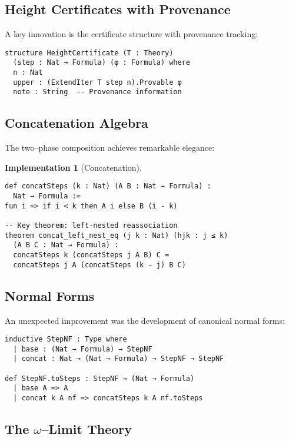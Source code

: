 \documentclass[11pt]{article}
\theoremstyle{definition}
\newtheorem{implementation}[theorem]{Implementation}
\theoremstyle{remark}
\begin{document}
\subsection{Height Certificates with Provenance}

A key innovation is the certificate structure with provenance tracking:

\begin{lstlisting}[language={}]
structure HeightCertificate (T : Theory) 
  (step : Nat → Formula) (φ : Formula) where
  n : Nat
  upper : (ExtendIter T step n).Provable φ
  note : String  -- Provenance information
\end{lstlisting}

\subsection{Concatenation Algebra}

The two--phase composition achieves remarkable elegance:

\begin{implementation}[Concatenation]
\begin{lstlisting}[language={}]
def concatSteps (k : Nat) (A B : Nat → Formula) : 
  Nat → Formula :=
fun i => if i < k then A i else B (i - k)

-- Key theorem: left-nested reassociation
theorem concat_left_nest_eq (j k : Nat) (hjk : j ≤ k) 
  (A B C : Nat → Formula) :
  concatSteps k (concatSteps j A B) C = 
  concatSteps j A (concatSteps (k - j) B C)
\end{lstlisting}
\end{implementation}

\subsection{Normal Forms}

An unexpected improvement was the development of canonical normal forms:

\begin{lstlisting}[language={}]
inductive StepNF : Type where
  | base : (Nat → Formula) → StepNF
  | concat : Nat → (Nat → Formula) → StepNF → StepNF

def StepNF.toSteps : StepNF → (Nat → Formula)
  | base A => A
  | concat k A nf => concatSteps k A nf.toSteps
\end{lstlisting}

\subsection{The $\omega$--Limit Theory}
\end{document}
